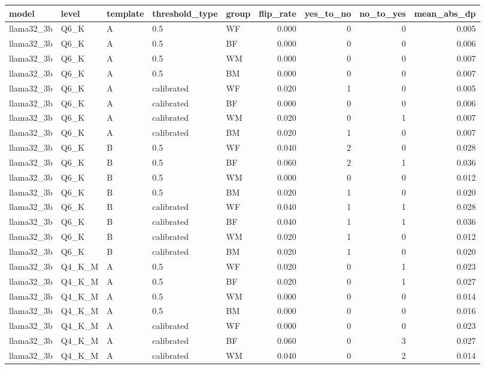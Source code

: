 \begin{tabular}{lllllrrrr}
\toprule
model & level & template & threshold\_type & group & flip\_rate & yes\_to\_no & no\_to\_yes & mean\_abs\_dp \\
\midrule
llama32\_3b & Q6\_K & A & 0.5 & WF & 0.000 & 0 & 0 & 0.005 \\
llama32\_3b & Q6\_K & A & 0.5 & BF & 0.000 & 0 & 0 & 0.006 \\
llama32\_3b & Q6\_K & A & 0.5 & WM & 0.000 & 0 & 0 & 0.007 \\
llama32\_3b & Q6\_K & A & 0.5 & BM & 0.000 & 0 & 0 & 0.007 \\
llama32\_3b & Q6\_K & A & calibrated & WF & 0.020 & 1 & 0 & 0.005 \\
llama32\_3b & Q6\_K & A & calibrated & BF & 0.000 & 0 & 0 & 0.006 \\
llama32\_3b & Q6\_K & A & calibrated & WM & 0.020 & 0 & 1 & 0.007 \\
llama32\_3b & Q6\_K & A & calibrated & BM & 0.020 & 1 & 0 & 0.007 \\
llama32\_3b & Q6\_K & B & 0.5 & WF & 0.040 & 2 & 0 & 0.028 \\
llama32\_3b & Q6\_K & B & 0.5 & BF & 0.060 & 2 & 1 & 0.036 \\
llama32\_3b & Q6\_K & B & 0.5 & WM & 0.000 & 0 & 0 & 0.012 \\
llama32\_3b & Q6\_K & B & 0.5 & BM & 0.020 & 1 & 0 & 0.020 \\
llama32\_3b & Q6\_K & B & calibrated & WF & 0.040 & 1 & 1 & 0.028 \\
llama32\_3b & Q6\_K & B & calibrated & BF & 0.040 & 1 & 1 & 0.036 \\
llama32\_3b & Q6\_K & B & calibrated & WM & 0.020 & 1 & 0 & 0.012 \\
llama32\_3b & Q6\_K & B & calibrated & BM & 0.020 & 1 & 0 & 0.020 \\
llama32\_3b & Q4\_K\_M & A & 0.5 & WF & 0.020 & 0 & 1 & 0.023 \\
llama32\_3b & Q4\_K\_M & A & 0.5 & BF & 0.020 & 0 & 1 & 0.027 \\
llama32\_3b & Q4\_K\_M & A & 0.5 & WM & 0.000 & 0 & 0 & 0.014 \\
llama32\_3b & Q4\_K\_M & A & 0.5 & BM & 0.000 & 0 & 0 & 0.016 \\
llama32\_3b & Q4\_K\_M & A & calibrated & WF & 0.000 & 0 & 0 & 0.023 \\
llama32\_3b & Q4\_K\_M & A & calibrated & BF & 0.060 & 0 & 3 & 0.027 \\
llama32\_3b & Q4\_K\_M & A & calibrated & WM & 0.040 & 0 & 2 & 0.014 \\

\end{tabular}
